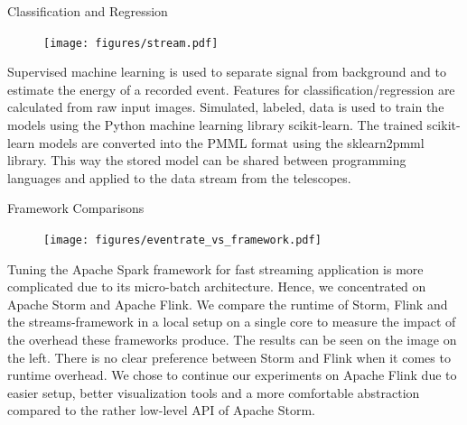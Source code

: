 \begin{multicols}{2}
    \begin{block}[]{Classification and Regression}%
      \begin{multicols}{2}
          \begin{figure}
            \texttt{[image: figures/stream.pdf]}\\
          \end{figure}
        \columnbreak
        Supervised machine learning is used to separate signal from background and to estimate
        the energy of a recorded event. Features for classification/regression are calculated from raw input
        images.
        Simulated, labeled, data is used to train the models using the Python machine learning library scikit-learn\cite{sklearn}.
        The trained scikit-learn models are converted into the PMML\cite{pmml} format using the sklearn2pmml\cite{sklearn2pmml} library.
        This way the stored model can be shared
        between programming languages and applied to the data stream from the telescopes.
      \end{multicols}
    \end{block}%

    \begin{block}[]{Framework Comparisons}%
      \begin{multicols}{2}
        \begin{figure}
          \texttt{[image: figures/eventrate\_vs\_framework.pdf]}\\
        \end{figure}
        \columnbreak
        Tuning the Apache Spark framework for fast streaming application is more complicated due to its micro-batch architecture.
        Hence, we concentrated on Apache Storm and Apache Flink. We compare the runtime of Storm, Flink and the streams-framework in
        a local setup on a single core to measure the impact of the overhead these frameworks produce.
        The results can be seen on the image on the left.
        There is no clear preference between Storm and Flink when it comes to runtime overhead. We chose to continue our experiments on
        Apache Flink due to easier setup, better visualization tools and a more comfortable abstraction compared to the rather low-level
        API of Apache Storm.
      \end{multicols}
    \end{block}%


\end{multicols}
